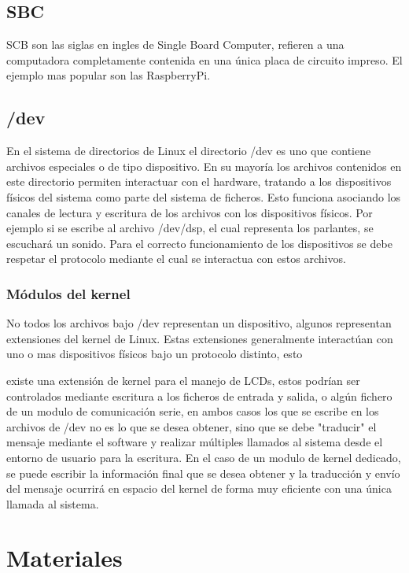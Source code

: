 \documentclass[12pt,letterpaper]{article}     %
\begin{document}
\subsection{SBC}

SCB son las siglas en ingles de Single Board Computer, refieren a una computadora completamente contenida en una
única placa de circuito impreso. El ejemplo mas popular son las RaspberryPi.

\subsection{/dev}

En el sistema de directorios de Linux el directorio /dev es uno que contiene archivos especiales 
o de tipo dispositivo. En su mayoría los archivos contenidos en este directorio permiten interactuar con el
hardware, tratando a los dispositivos físicos del sistema como parte del sistema de ficheros. Esto funciona 
asociando los canales de lectura y escritura de los archivos con los dispositivos físicos. Por ejemplo
si se escribe al archivo /dev/dsp, el cual representa los parlantes, se escuchará un sonido. Para el correcto
funcionamiento de los dispositivos se debe respetar el protocolo mediante el cual se interactua con estos archivos.

\subsubsection{Módulos del kernel}

No todos los archivos bajo /dev representan un dispositivo, algunos representan extensiones del kernel de Linux.
Estas extensiones generalmente interactúan con uno o mas dispositivos físicos bajo un protocolo distinto, esto

existe una extensión de kernel para el manejo de LCDs, estos podrían ser controlados mediante escritura a los
ficheros de entrada y salida, o algún fichero de un modulo de comunicación serie, en ambos casos los que se 
escribe en los archivos de /dev no es lo que se desea obtener, sino que se debe "traducir" el mensaje mediante el
software y realizar múltiples llamados al sistema desde el entorno de usuario para la escritura. En el caso de un
modulo de kernel dedicado, se puede escribir la información final que se desea obtener y la traducción y envío del
mensaje ocurrirá en espacio del kernel de forma muy eficiente con una única llamada al sistema. 

\clearpage
\section{Materiales}
\end{document}
